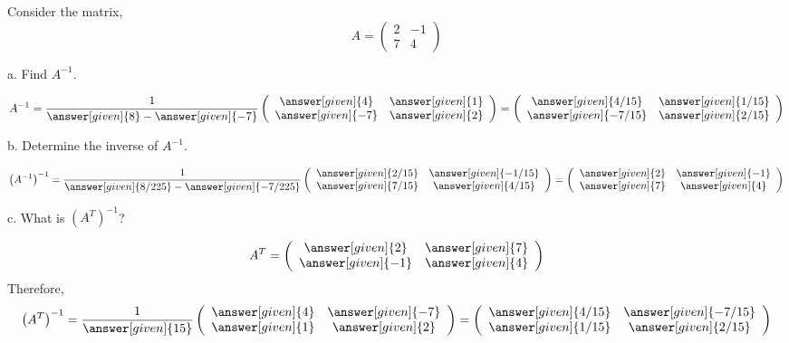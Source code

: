 \documentclass{ximera}
\begin{document}
\begin{example}\label{example1}
Consider the matrix,
\[A= \left(\begin{array}{cc}
  2 &  -1  \\
   7&  4
\end{array}\right)\]

a. Find $A^{-1}$.
\begin{prompt}
\[A^{-1}= \frac{1}{\answer[given]{8}- \answer[given]{-7}}\left(\begin{array}{cc}
  \answer[given]{4} &  \answer[given]{1}  \\
   \answer[given]{-7}&  \answer[given]{2}
\end{array}\right)= \left(\begin{array}{cc}
  \answer[given]{4/15} &  \answer[given]{1/15}  \\
   \answer[given]{-7/15}&  \answer[given]{2/15}
\end{array}\right)
\]
\end{prompt}
b. Determine the inverse of $A^{-1}$.
\begin{prompt}
\[\left(A^{-1}\right)^{-1}= \frac{1}{\answer[given]{8/225}- \answer[given]{-7/225}}\left(\begin{array}{cc}
  \answer[given]{2/15} &  \answer[given]{-1/15}  \\
   \answer[given]{7/15}&  \answer[given]{4/15}
\end{array}\right)= \left(\begin{array}{cc}
  \answer[given]{2} &  \answer[given]{-1}  \\
   \answer[given]{7}&  \answer[given]{4}
\end{array}\right)
\]
\end{prompt}
c. What is $\left(A^{T}\right)^{-1}$?
\begin{prompt}
\[A^{T}= \left(\begin{array}{cc}
  \answer[given]{2} &  \answer[given]{7}  \\
   \answer[given]{-1}&  \answer[given]{4}
\end{array}\right)
\]
Therefore,
\[\left(A^{T}\right)^{-1}= \frac{1}{\answer[given]{15}}\left(\begin{array}{cc}
  \answer[given]{4} &  \answer[given]{-7}  \\
   \answer[given]{1}&  \answer[given]{2}
\end{array}\right) = \left(\begin{array}{cc}
  \answer[given]{4/15} &  \answer[given]{-7/15}  \\
   \answer[given]{1/15}&  \answer[given]{2/15}
\end{array}\right) \]
\end{prompt}


\end{example}
\end{document}
